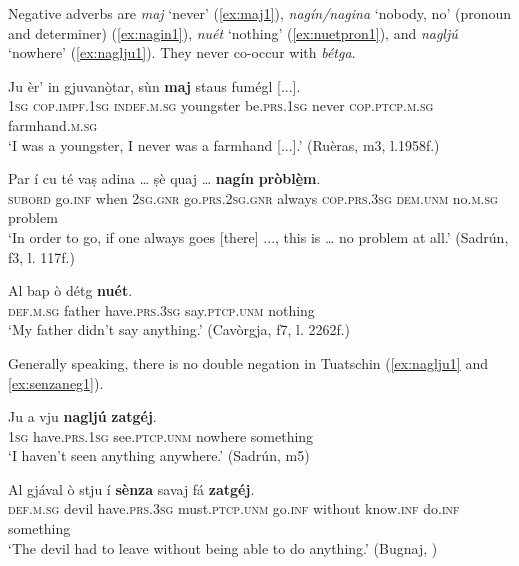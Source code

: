 Negative adverbs are \textit{maj} `never' (\ref{ex:maj1}), \textit{nagín/nagina} `nobody, no' (pronoun and determiner) (\ref{ex:nagin1}), \textit{nuét} `nothing' (\ref{ex:nuetpron1}), and \textit{nagljú} `nowhere' (\ref{ex:naglju1}). They never co-occur with \textit{bétga}.

\ea
\label{ex:maj1}
\gll Ju èr’ in gjuvanò̱tar, sùn \textbf{maj} staus fumégl [...].\\
\textsc{1sg} \textsc{cop.impf.1sg} \textsc{indef.m.sg} youngster be.\textsc{prs.1sg} never \textsc{cop.ptcp.m.sg} farmhand.\textsc{m.sg} \\
\glt `I was a youngster, I never was a farmhand [...].' (Ruèras, m3, l.1958f.)
\z

\ea
\label{ex:nagin1}
\gll  Par í cu té vaṣ adina … ṣè quaj … \textbf{nagín} \textbf{pròblè̱m}.  \\
\textsc{subord} go.\textsc{inf} when \textsc{2sg.gnr} go.\textsc{prs.2sg.gnr} always {} \textsc{cop.prs.3sg} \textsc{dem.unm} {} no.\textsc{m.sg} problem \\
\glt `In order to go, if one always goes [there] ..., this is … no problem at all.' (Sadrún, f3, l. 117f.)
\z

\ea
\label{ex:nuetpron1}
	\gll Al bap ò détg \textbf{nuét}.\\
\textsc{def.m.sg} father have.\textsc{prs.3sg} say.\textsc{ptcp.unm} nothing\\
\glt `My father didn't say anything.' (Cavòrgja, f7, l. 2262f.)
\z

Generally speaking, there is no double negation in Tuatschin (\ref{ex:naglju1} and \ref{ex:senzaneg1}).

\ea
\label{ex:naglju1}
\gll Ju a vju \textbf{nagljú} \textbf{zatgéj}.\\
\textsc{1sg} have.\textsc{prs.1sg} see.\textsc{ptcp.unm} nowhere something\\
\glt `I haven't seen anything anywhere.' (Sadrún, m5)
\z

\ea
\label{ex:senzaneg1}
\gll    Al gjával ò stju í \textbf{sènza} savaj fá \textbf{zatgéj}.\\
      \textsc{def.m.sg} devil have.\textsc{prs.3sg} must.\textsc{ptcp.unm} go.\textsc{inf} without know.\textsc{inf} do.\textsc{inf} something \\
\glt `The devil had to leave without being able to do anything.' (Bugnaj, \citealt[147]{Büchli1966})
\z



